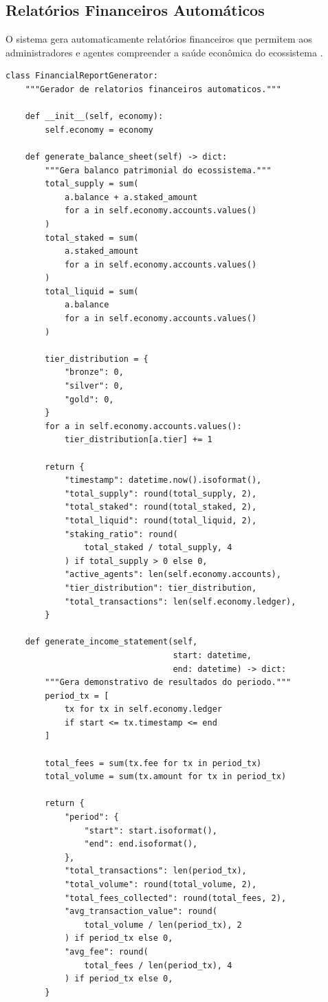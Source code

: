 \subsection{Relatórios Financeiros Automáticos}

O sistema gera automaticamente relatórios financeiros que
permitem aos administradores e agentes compreender a saúde
econômica do ecossistema \cite{opencode2026token}.

\begin{lstlisting}[caption={Gerador de relatorios financeiros},
                  label={lst:financial-reports}]
class FinancialReportGenerator:
    """Gerador de relatorios financeiros automaticos."""

    def __init__(self, economy):
        self.economy = economy

    def generate_balance_sheet(self) -> dict:
        """Gera balanco patrimonial do ecossistema."""
        total_supply = sum(
            a.balance + a.staked_amount
            for a in self.economy.accounts.values()
        )
        total_staked = sum(
            a.staked_amount
            for a in self.economy.accounts.values()
        )
        total_liquid = sum(
            a.balance
            for a in self.economy.accounts.values()
        )

        tier_distribution = {
            "bronze": 0,
            "silver": 0,
            "gold": 0,
        }
        for a in self.economy.accounts.values():
            tier_distribution[a.tier] += 1

        return {
            "timestamp": datetime.now().isoformat(),
            "total_supply": round(total_supply, 2),
            "total_staked": round(total_staked, 2),
            "total_liquid": round(total_liquid, 2),
            "staking_ratio": round(
                total_staked / total_supply, 4
            ) if total_supply > 0 else 0,
            "active_agents": len(self.economy.accounts),
            "tier_distribution": tier_distribution,
            "total_transactions": len(self.economy.ledger),
        }

    def generate_income_statement(self,
                                  start: datetime,
                                  end: datetime) -> dict:
        """Gera demonstrativo de resultados do periodo."""
        period_tx = [
            tx for tx in self.economy.ledger
            if start <= tx.timestamp <= end
        ]

        total_fees = sum(tx.fee for tx in period_tx)
        total_volume = sum(tx.amount for tx in period_tx)

        return {
            "period": {
                "start": start.isoformat(),
                "end": end.isoformat(),
            },
            "total_transactions": len(period_tx),
            "total_volume": round(total_volume, 2),
            "total_fees_collected": round(total_fees, 2),
            "avg_transaction_value": round(
                total_volume / len(period_tx), 2
            ) if period_tx else 0,
            "avg_fee": round(
                total_fees / len(period_tx), 4
            ) if period_tx else 0,
        }
\end{lstlisting}

